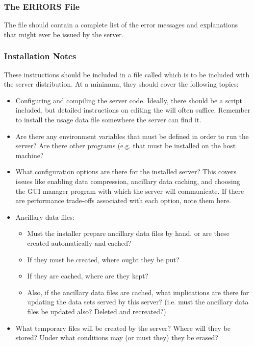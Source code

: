 \subsubsection{The ERRORS File}

The  file should contain a complete list of the error messages
and explanations that might ever be issued by the server.


\subsubsection{Installation Notes}

These instructions should be included in a file called  which is
to be included with the server distribution. At a minimum, they should
cover the following topics:

\begin{itemize}

\item Configuring and compiling the server code. Ideally, there should be
a  script included, but detailed instructions on editing
the  will often suffice. Remember to install the
usage data file somewhere the server can find it.

\item Are there any environment variables that must be defined in order
to run the server? Are there other programs (e.g.  that must
be installed on the host machine?

\item What configuration options are there for the installed server? This
covers issues like enabling data compression, ancillary data caching,
and choosing the GUI manager program with which the server will
communicate. If there are performance trade-offs associated with
each option, note them here.

\item Ancillary data files:

  \begin{itemize}
  \item Must the installer prepare ancillary data files by hand, or
    are these created automatically and cached?
  \item If they must be created, where ought they be put? 
  \item If they are cached, where are they kept? 
  \item Also, if the ancillary data files are cached, what
    implications are there for updating the data sets served by this
    server? (i.e. must the ancillary data files be updated also?
    Deleted and recreated?)
  \end{itemize}

\item What temporary files will be created by the server? Where will they
be stored? Under what conditions may (or must they) they be
erased?

\end{itemize}

